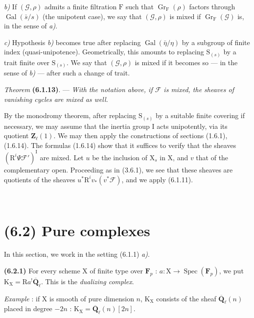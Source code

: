 \documentclass[11pt,leqno]{article}
\newcommand{\Page}[1]{\ifvmode\noindent\else\unskip\ \fi{\footnotesize\textcolor{gray}{[p.\,#1]}}\ \ignorespaces}
\begin{document}
\textit{b)} If \((\mathscr{G},\rho)\) admits a finite filtration
\(\mathrm{F}\) such that \(\operatorname{Gr}_{\mathrm{F}}(\rho)\)
factors through \(\operatorname{Gal}(\bar{s}/s)\) (the unipotent case),
we say that \((\mathscr{G},\rho)\) is mixed if
\(\operatorname{Gr}_{\mathrm{F}}(\mathscr{G})\) is, in the sense of
\textit{a)}.

\textit{c)} Hypothesis \textit{b)} becomes true after replacing
\(\operatorname{Gal}(\bar{\eta}/\eta)\) by a subgroup of finite
index (quasi-unipotence). Geometrically, this amounts to replacing
\(\mathrm{S}_{(s)}\) by a trait finite over \(\mathrm{S}_{(s)}\).
We say that \((\mathscr{G},\rho)\) is mixed if it becomes so — in
the sense of \textit{b)} — after such a change of trait.

\textit{Theorem} \textbf{(6.1.13)}. — \textit{With the notation
above, if \(\mathscr{F}\) is mixed, the sheaves of vanishing
cycles are mixed as well.}

By the monodromy theorem, after replacing
\(\mathrm{S}_{(s)}\) by a suitable finite covering if necessary, we may
assume that the inertia group \(\mathrm{I}\) acts
unipotently, via its quotient \(\mathbf{Z}_\ell(1)\). We may then
apply the constructions of sections (1.6.1), (1.6.14).
The formulas (1.6.14) show that it suffices to verify that the
sheaves \((\mathrm{R}^i\Psi\mathscr{F}')^{\mathrm{I}}\) are
mixed. Let \(u\) be the inclusion of \(\mathrm{X}_s\) in
\(\mathrm{X}\), and \(v\) that of the complementary open.
Proceeding as in (3.6.1), we see that these sheaves are quotients
of the sheaves \(u^*\mathrm{R}^iv_*(v^*\mathscr{F})\), and we apply
(6.1.11).

\Page{247}
\section*{(6.2) Pure complexes}

In this section, we work in the setting (6.1.1) \textit{a)}.

\textbf{(6.2.1)} For every scheme \(\mathrm{X}\) of finite type over
\(\mathbf{F}_p\) : \(a:\mathrm{X}\to\operatorname{Spec}(\mathbf{F}_p)\),
we put \(\mathrm{K}_{\mathrm{X}}=\mathrm{R}a^!\overline{\mathbf{Q}}_\ell\).
This is the \textit{dualizing complex}.

\textit{Example} : if \(\mathrm{X}\) is smooth of pure dimension
\(n\), \(\mathrm{K}_{\mathrm{X}}\) consists of the sheaf
\(\overline{\mathbf{Q}}_\ell(n)\) placed in degree \(-2n\) :
\(\mathrm{K}_{\mathrm{X}}=\overline{\mathbf{Q}}_\ell(n)[2n]\).
\end{document}
